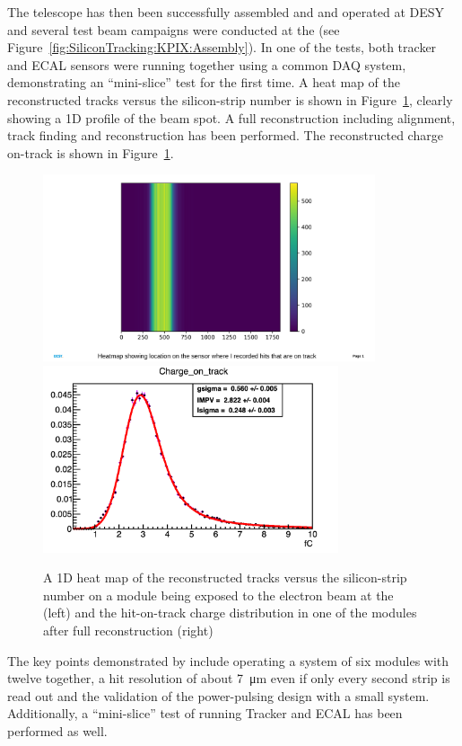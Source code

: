 The \LYCORIS telescope has then been successfully assembled and and operated at DESY and several test beam campaigns were conducted at the \DIITBF (see Figure~\ref{fig:SiliconTracking:KPIX:Assembly}). 
In one of the tests, both \SID tracker and \SID ECAL sensors were running together using a common DAQ system, demonstrating an \SID ``mini-slice'' test for the first time. 
A heat map of the reconstructed tracks versus the silicon-strip number is shown in Figure~\ref{fig:SiliconTracking:KPIX:Results}, clearly showing a 1D profile of the beam spot. 
A full reconstruction including alignment, track finding and reconstruction has been performed. The reconstructed charge on-track is shown in Figure~\ref{fig:SiliconTracking:KPIX:Results}. 
\begin{figure}[htbp]
\includegraphics[height=5.5cm]{Tracker/KPIX/KPIX_heatmap_hitsOnTrack.pdf}
\includegraphics[height=5.5cm]{Tracker/KPIX/KPIX_signal_Landau_Run897.png}
\caption{A 1D heat map of the reconstructed tracks versus the silicon-strip number on a \LYCORIS module being exposed to the electron beam at the \DIITBF (left) and the hit-on-track charge distribution in 
one of the \LYCORIS modules after full reconstruction (right)}
\label{fig:SiliconTracking:KPIX:Results}
\end{figure}

The key points demonstrated by \LYCORIS include operating a system of six modules with twelve \KPIX together, 
a hit resolution of about \SI{7}{\micro\meter} even if only every second strip is read out and the 
validation of the power-pulsing design with a small system. Additionally, a ``mini-slice'' test of running \SID Tracker and \SID ECAL has been performed as well. 

